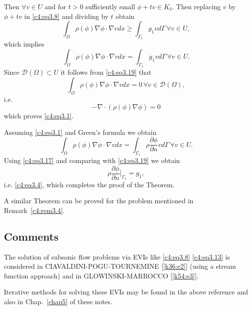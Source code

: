 Then $\forall v \in U$ and for $t> 0$ sufficiently small $\phi + tv
\in K_\delta$. Then replacing $v$ by $\phi + tv$ in \eqref{c4:eq3.8}
and dividing by $t$ obtain 
$$
\int_\Omega \rho (\phi) \nabla \phi \cdot \nabla v dx \geq \int
_{\Gamma_1} g_1 v d \Gamma\, \forall v \in U, 
$$
which implies 
\begin{equation}
\int_\Omega \rho (\phi) \nabla \phi \cdot \nabla v dx = \int _{\Gamma_1} g_1 v d \Gamma\, \forall v \in U. \tag{3.19}\label{c4:eq3.19}
\end{equation}
Since $\mathscr{D}(\Omega) \subset U$ it follows from \eqref{c4:eq3.19} that 
\begin{equation}
\int_\Omega \rho (\phi) \nabla \phi \cdot \nabla v dx = 0\, \forall v \in \mathscr{D}(\Omega), \tag{3.20}\label{c4:eq3.20}
\end{equation}
i.e.
$$
-\nabla \cdot (\rho (\phi) \nabla \phi) = 0
$$
which proves \eqref{c4:eq3.1}.

Assuming \eqref{c4:eq3.1} and Green's formula we obtain
\begin{equation}
\int_\Omega \rho (\phi) \nabla \phi \cdot \nabla v dx = \int _{\Gamma_{1}} \rho \frac{\partial \phi}{\partial n} v d \Gamma\, \forall v \in U. \tag{3.21}\label{c4:eq3.21}
\end{equation}
Using \eqref{c4:eq3.17} and comparing with \eqref{c4:eq3.19} we obtain 
$$
\rho \frac{\partial \phi}{\partial n}|_{\Gamma_1} = g_1,
$$
i.e. \eqref{c4:eq3.4}, which completes the proof of the Theorem.

\begin{remark}\label{c4:rem3.6}%
A similar Theorem can be proved for the problem mentioned in 
Remark~\ref{c4:rem3.4}.
\end{remark}

\subsection{Comments}\label{c4:ss3.4}

The solution of subsonic flow problems via EVIs like \eqref{c4:eq3.8}
\eqref{c4:eq3.13} is considered in CIAVALDINI-POGU-TOURNEMINE [\ref{k36:e2}]
(using a stream function approach) and in GLOWINSKI-MARROCCO [\ref{k54:e3}]. 

Iterative methods for solving these EVIs may be found in the above 
reference and also in Chap.~\ref{chap5} of these notes. 
